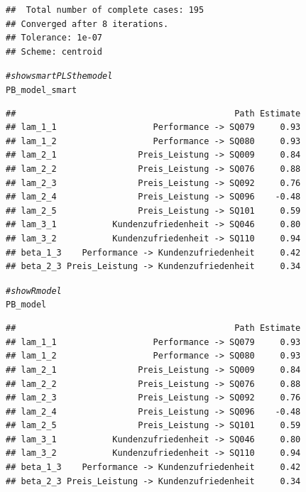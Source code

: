 \documentclass{article}\usepackage[]{graphicx}\usepackage[]{color}
\makeatletter
\newcommand{\hlcom}[1]{\textcolor[rgb]{0.678,0.584,0.686}{\textit{#1}}}%
\newcommand{\hlstd}[1]{\textcolor[rgb]{0.345,0.345,0.345}{#1}}%
\newenvironment{kframe}{%
 \def\at@end@of@kframe{}%
 \ifinner\ifhmode%
  \def\at@end@of@kframe{\end{minipage}}%
  \begin{minipage}{\columnwidth}%
 \fi\fi%
 \def\FrameCommand##1{\hskip\@totalleftmargin \hskip-\fboxsep
 \colorbox{shadecolor}{##1}\hskip-\fboxsep
     \hskip-\linewidth \hskip-\@totalleftmargin \hskip\columnwidth}%
 \MakeFramed {\advance\hsize-\width
   \@totalleftmargin\z@ \linewidth\hsize
   \@setminipage}}%
 {\par\unskip\endMakeFramed%
 \at@end@of@kframe}
\newenvironment{knitrout}{}{} %
\makeatother
\begin{document}
\begin{knitrout}
\begin{kframe}
\begin{verbatim}
##  Total number of complete cases: 195 
## Converged after 8 iterations.
## Tolerance: 1e-07
## Scheme: centroid
\end{verbatim}
\begin{alltt}
\hlcom{#show smartPLS the model}
\hlstd{PB_model_smart}
\end{alltt}
\begin{verbatim}
##                                           Path Estimate
## lam_1_1                   Performance -> SQ079     0.93
## lam_1_2                   Performance -> SQ080     0.93
## lam_2_1                Preis_Leistung -> SQ009     0.84
## lam_2_2                Preis_Leistung -> SQ076     0.88
## lam_2_3                Preis_Leistung -> SQ092     0.76
## lam_2_4                Preis_Leistung -> SQ096    -0.48
## lam_2_5                Preis_Leistung -> SQ101     0.59
## lam_3_1           Kundenzufriedenheit -> SQ046     0.80
## lam_3_2           Kundenzufriedenheit -> SQ110     0.94
## beta_1_3    Performance -> Kundenzufriedenheit     0.42
## beta_2_3 Preis_Leistung -> Kundenzufriedenheit     0.34
\end{verbatim}
\begin{alltt}
\hlcom{#show R model}
\hlstd{PB_model}
\end{alltt}
\begin{verbatim}
##                                           Path Estimate
## lam_1_1                   Performance -> SQ079     0.93
## lam_1_2                   Performance -> SQ080     0.93
## lam_2_1                Preis_Leistung -> SQ009     0.84
## lam_2_2                Preis_Leistung -> SQ076     0.88
## lam_2_3                Preis_Leistung -> SQ092     0.76
## lam_2_4                Preis_Leistung -> SQ096    -0.48
## lam_2_5                Preis_Leistung -> SQ101     0.59
## lam_3_1           Kundenzufriedenheit -> SQ046     0.80
## lam_3_2           Kundenzufriedenheit -> SQ110     0.94
## beta_1_3    Performance -> Kundenzufriedenheit     0.42
## beta_2_3 Preis_Leistung -> Kundenzufriedenheit     0.34
\end{verbatim}
\end{kframe}
\end{knitrout}
\end{document}
